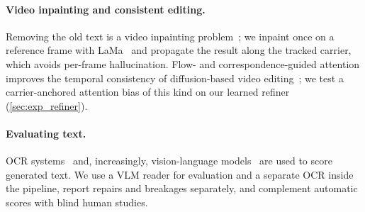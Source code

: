 \paragraph{Video inpainting and consistent editing.} Removing the old text is a video inpainting problem~\cite{zhou2023propainter,bian2025videopainter}; we inpaint once on a reference frame with LaMa~\cite{suvorov2022lama} and propagate the result along the tracked carrier, which avoids per-frame hallucination. Flow- and correspondence-guided attention improves the temporal consistency of diffusion-based video editing~\cite{cong2024flatten,geyer2024tokenflow}; we test a carrier-anchored attention bias of this kind on our learned refiner (\cref{sec:exp_refiner}).

\paragraph{Evaluating text.} OCR systems~\cite{baek2019craft,shi2017crnn,du2020ppocr} and, increasingly, vision-language models~\cite{bai2025qwen25vl} are used to score generated text. We use a VLM reader for evaluation and a separate OCR inside the pipeline, report repairs and breakages separately, and complement automatic scores with blind human studies.
